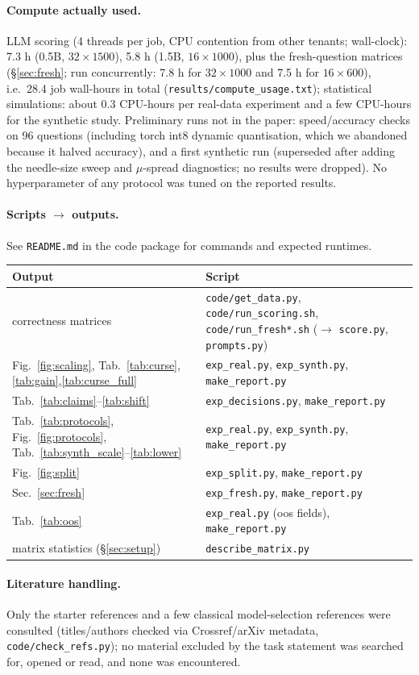 \paragraph{Compute actually used.} LLM scoring (4 threads per job, CPU contention from other tenants; wall-clock): 7.3 h (0.5B, $32\times1500$), 5.8 h (1.5B, $16\times1000$), plus the fresh-question matrices (\S\ref{sec:fresh}; run concurrently: 7.8 h for $32\times1000$ and 7.5 h for $16\times600$), i.e.\ 28.4 job wall-hours in total (\texttt{results/compute\_usage.txt}); statistical simulations: about 0.3 CPU-hours per real-data experiment and a few CPU-hours for the synthetic study. Preliminary runs not in the paper: speed/accuracy checks on 96 questions (including torch int8 dynamic quantisation, which we abandoned because it halved accuracy), and a first synthetic run (superseded after adding the needle-size sweep and $\mu$-spread diagnostics; no results were dropped). No hyperparameter of any protocol was tuned on the reported results.
\paragraph{Scripts $\to$ outputs.} See \texttt{README.md} in the code package for commands and expected runtimes.
\begin{center}\footnotesize\begin{tabular}{ll}
\toprule Output & Script\\ \midrule
correctness matrices & \texttt{code/get\_data.py}, \texttt{code/run\_scoring.sh}, \texttt{code/run\_fresh*.sh} ($\to$ \texttt{score.py}, \texttt{prompts.py})\\
Fig.~\ref{fig:scaling}, Tab.~\ref{tab:curse},\ref{tab:gain},\ref{tab:curse_full} & \texttt{exp\_real.py}, \texttt{exp\_synth.py}, \texttt{make\_report.py}\\
Tab.~\ref{tab:claims}--\ref{tab:shift} & \texttt{exp\_decisions.py}, \texttt{make\_report.py}\\
Tab.~\ref{tab:protocols}, Fig.~\ref{fig:protocols}, Tab.~\ref{tab:synth_scale}--\ref{tab:lower} & \texttt{exp\_real.py}, \texttt{exp\_synth.py}, \texttt{make\_report.py}\\
Fig.~\ref{fig:split} & \texttt{exp\_split.py}, \texttt{make\_report.py}\\
Sec.~\ref{sec:fresh} & \texttt{exp\_fresh.py}, \texttt{make\_report.py}\\
Tab.~\ref{tab:oos} & \texttt{exp\_real.py} (oos fields), \texttt{make\_report.py}\\
matrix statistics (\S\ref{sec:setup}) & \texttt{describe\_matrix.py}\\
\bottomrule\end{tabular}\end{center}
\paragraph{Literature handling.} Only the starter references and a few classical model-selection references were consulted (titles/authors checked via Crossref/arXiv metadata, \texttt{code/check\_refs.py}); no material excluded by the task statement was searched for, opened or read, and none was encountered.
